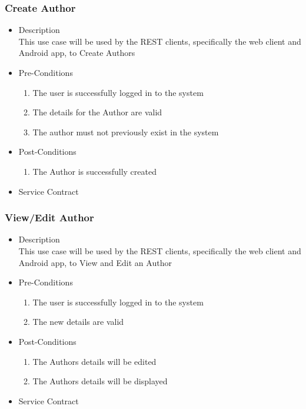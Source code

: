 \documentclass[a4paper,10pt]{article}
\begin{document}
\subsubsection{Create Author}
	\begin{itemize}
		\item Description\\
			This use case will be used by the REST clients, specifically the web client and Android app, to Create Authors
		\item Pre-Conditions
			\begin{enumerate}
				\item The user is successfully logged in to the system
				\item The details for the Author are valid
				\item The author must not previously exist in the system 
			\end{enumerate}
		\item Post-Conditions
			\begin{enumerate}
				\item The Author is successfully created	
			\end{enumerate}
		\item Service Contract
	\end{itemize}

\subsubsection{View/Edit Author}
	\begin{itemize}
		\item Description\\
			This use case will be used by the REST clients, specifically the web client and Android app, to View and Edit an Author
		\item Pre-Conditions
			\begin{enumerate}
				\item The user is successfully logged in to the system
				\item The new details are valid
			\end{enumerate}
		\item Post-Conditions
			\begin{enumerate}
				\item The Authors details will be edited
				\item The Authors details will be displayed
						
			\end{enumerate}
		\item Service Contract
	\end{itemize}
\end{document}
